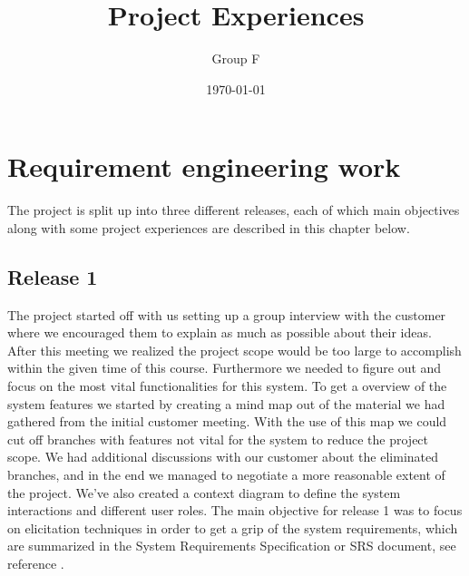 \documentclass[10pt]{article}
\begin{document}
\makeatletter
\renewcommand{\@biblabel}[1]{\quad#1.}
\makeatother


\pagestyle{myheadings}





\begin{titlepage}
\title{Project Experiences}
\author{Group F}
\date{\today}
\maketitle
\thispagestyle{empty}
\end{titlepage}

\tableofcontents
\thispagestyle{empty}
\newpage
{}

\section{Requirement engineering work}
\noindent The project is split up into three different releases, each of which main objectives along with some project experiences are described in this chapter below.



\subsection{Release 1}
The project started off with us setting up a group interview with the customer where we encouraged them to explain as much as possible about their ideas. After this meeting we realized the project scope would be too large to accomplish within the given time of this course. Furthermore we needed to figure out and focus on the most vital functionalities for this system.
To get a overview of the system features we started by creating a mind map out of the material we had gathered from the initial customer meeting. With the use of this map we could cut off branches with features not vital for the system to reduce the project scope.
We had additional discussions with our customer about the eliminated branches, and in the end we managed to negotiate a more reasonable extent of the project.
\newline We've also created a context diagram to define the system interactions and different user roles.
The main objective for release 1 was to focus on elicitation techniques in order to get a grip of the system requirements, which are summarized in the System Requirements Specification or SRS document, see reference \cite{srs}.
\end{document}

